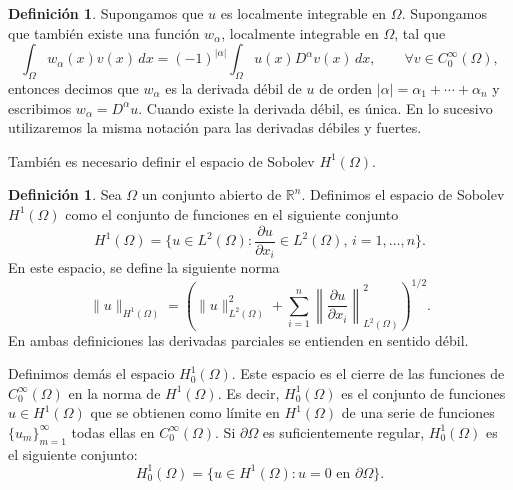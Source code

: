 \documentclass[a4paper,11pt,spanish, twoside, leqno]{tfg-uam}
\theoremstyle{definition}
\newtheorem{defin}[teor]{Definici\'on}
\begin{document}
\begin{mdframed}
    \begin{defin}
        Supongamos que $u$ es localmente integrable en $\Omega$. Supongamos que también existe una función $w_\alpha$, localmente integrable en $\Omega$, tal que
        \begin{equation*}
            \int_\Omega w_\alpha(x)v(x) \, dx = (-1)^{|\alpha|} \int_\Omega u(x)D^\alpha v(x) \, dx, \qquad \forall v \in C_0^\infty(\Omega),
        \end{equation*}
        entonces decimos que $w_\alpha$ es la derivada débil de $u$ de orden $|\alpha| = \alpha_1 + \cdots + \alpha_n$ y escribimos $w_\alpha = D^\alpha u$. Cuando existe la derivada débil, es única. En lo sucesivo utilizaremos la misma notación para las derivadas débiles y fuertes.
    \end{defin}
\end{mdframed}
También es necesario definir el espacio de Sobolev $H^1(\Omega)$.
\begin{mdframed}
\begin{defin}
    Sea $\Omega$ un conjunto abierto de $\mathbb{R}^n$. Definimos el espacio de Sobolev $H^1(\Omega)$ como el conjunto de funciones en el siguiente conjunto
    \begin{equation}
        H^1(\Omega)=\{u\in L^2(\Omega): \frac{\partial u}{\partial x_i}\in L^2(\Omega), \, i=1,\dots,n\}.
    \end{equation}
    En este espacio, se define la siguiente norma
    \begin{equation}
        \|u\|_{H^1(\Omega)}=\left(\|u\|^2_{L^2(\Omega)} + \sum_{i=1}^{n}\left\|\frac{\partial u}{\partial x_i}\right\|^2_{L^2(\Omega)}\right)^{1/2}.
    \end{equation}
    En ambas definiciones las derivadas parciales se entienden en sentido débil.
\end{defin}
\end{mdframed}
    
Definimos demás el espacio $H_0^1(\Omega)$. Este espacio es el cierre de las funciones de $C_0^\infty(\Omega)$ en la norma de $H^1(\Omega)$. Es decir, $H_0^1(\Omega)$ es el conjunto de funciones $u\in H^1(\Omega)$ que se obtienen como límite en $H^1(\Omega)$ de una serie de funciones $\{u_m\}_{m=1}^\infty$ todas ellas en $C_0^\infty(\Omega)$. Si $\partial\Omega$ es suficientemente regular, $H_0^1(\Omega)$ es el siguiente conjunto:
\begin{equation}
    H_0^1(\Omega)=\{u\in H^1(\Omega): u=0 \text{ en } \partial\Omega\}.
\end{equation}
\end{document}
